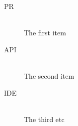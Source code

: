 
\begin{description}
  \item[PR] \hfill \\
  The first item
  \item[API] \hfill \\
  The second item
  \item[IDE] \hfill \\
  The third etc
\end{description}